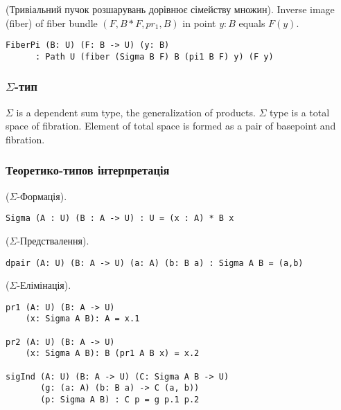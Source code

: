 \begin{theorem} (Тривіальний пучок розшарувань дорівнює сімейству множин).
Inverse image (fiber) of fiber bundle $(F,B*F,pr_1,B)$ in point $y:B$ equals $F(y)$.
\begin{lstlisting}
FiberPi (B: U) (F: B -> U) (y: B)
      : Path U (fiber (Sigma B F) B (pi1 B F) y) (F y)
\end{lstlisting}
\end{theorem}


\newpage
\subsubsection{$\Sigma$-тип}
$\Sigma$ is a dependent sum type, the generalization of products.
$\Sigma$ type is a total space of fibration. Element of total
space is formed as a pair of basepoint and fibration.

\subsubsection{Теоретико-типов інтерпретація}

\begin{definition} ($\Sigma$-Формація).
\begin{lstlisting}
Sigma (A : U) (B : A -> U) : U = (x : A) * B x
\end{lstlisting}
\end{definition}

\begin{definition} ($\Sigma$-Предствалення).
\begin{lstlisting}
dpair (A: U) (B: A -> U) (a: A) (b: B a) : Sigma A B = (a,b)
\end{lstlisting}
\end{definition}

\begin{definition} ($\Sigma$-Елімінація).
\begin{lstlisting}
pr1 (A: U) (B: A -> U)
    (x: Sigma A B): A = x.1

pr2 (A: U) (B: A -> U)
    (x: Sigma A B): B (pr1 A B x) = x.2

sigInd (A: U) (B: A -> U) (C: Sigma A B -> U)
       (g: (a: A) (b: B a) -> C (a, b))
       (p: Sigma A B) : C p = g p.1 p.2
\end{lstlisting}
\end{definition}

